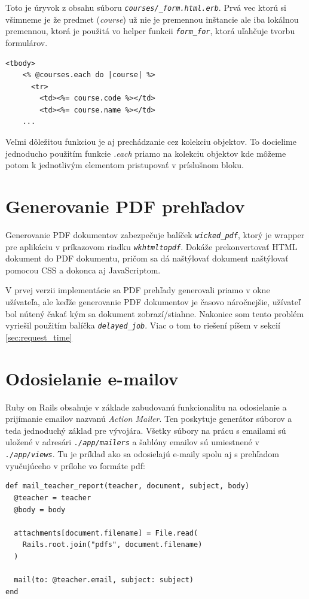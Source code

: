 Toto je úryvok z obsahu súboru \emph{\texttt{courses/\_form.html.erb}}. Prvá vec ktorú si všimneme je že predmet (\emph{course}) už nie je premennou inštancie ale iba lokálnou premennou, ktorá je použitá vo helper funkcii \emph{\texttt{form\_for}}, ktorá uľahčuje tvorbu formulárov.

\begin{verbatim}
<tbody>
    <% @courses.each do |course| %>
      <tr>
        <td><%= course.code %></td>
        <td><%= course.name %></td>
    ...
\end{verbatim}

Veľmi dôležitou funkciou je aj prechádzanie cez kolekciu objektov. To docielime jednoducho použitím funkcie \emph{.each} priamo na kolekciu objektov kde môžeme potom k jednotlivým elementom pristupovať v príslušnom bloku.

\section{Generovanie PDF prehľadov}

Generovanie PDF dokumentov zabezpečuje balíček \emph{\texttt{wicked\_pdf}}, ktorý je wrapper pre aplikáciu v príkazovom riadku \emph{\texttt{wkhtmltopdf}}. Dokáže prekonvertovať HTML dokument do PDF dokumentu, pričom sa dá naštýlovať dokument naštýlovať pomocou CSS a dokonca aj JavaScriptom. 

V prvej verzii implementácie sa PDF prehľady generovali priamo v okne užívateľa, ale keďže generovanie PDF dokumentov je časovo náročnejšie, užívateľ bol nútený čakať kým sa dokument zobrazí/stiahne. Nakoniec som tento problém vyriešil použitím balíčka \emph{\texttt{delayed\_job}}. Viac o tom to riešení píšem v sekcií \ref{sec:request_time}

\section{Odosielanie e-mailov}

Ruby on Rails obsahuje v základe zabudovanú funkcionalitu na odosielanie a prijímanie emailov nazvanú \emph{Action Mailer}. Ten poskytuje generátor súborov a teda jednoduchý základ pre vývojára. Všetky súbory na prácu s emailami sú uložené v adresári \emph{\texttt{./app/mailers}} a šablóny emailov sú umiestnené v \emph{\texttt{./app/views}}. Tu je príklad ako sa odosielajú e-maily spolu aj s prehľadom vyučujúceho v prílohe vo formáte pdf:

\begin{verbatim}
def mail_teacher_report(teacher, document, subject, body)
  @teacher = teacher
  @body = body
  
  attachments[document.filename] = File.read(
    Rails.root.join("pdfs", document.filename)
  )

  mail(to: @teacher.email, subject: subject)
end
\end{verbatim}

